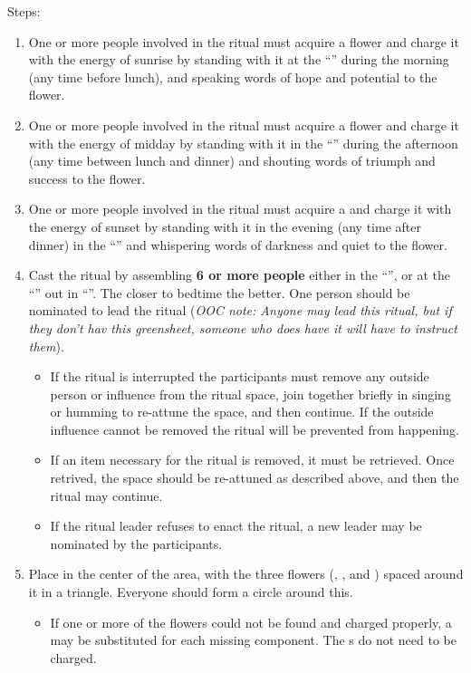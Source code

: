 \documentclass[green]{GL2020}
\begin{document}
Steps:
\begin{enumerate}
  \item One or more people involved in the ritual must acquire a \iMorningGlory{} flower and charge it with the energy of sunrise by standing with it at the ``\pGarden{}'' during the morning (any time before lunch), and speaking words of hope and potential to the flower. 
  \item One or more people involved in the ritual must acquire a \iLily{} flower and charge it with the energy of midday by standing with it in the ``\pTrainingField{}'' during the afternoon (any time between lunch and dinner) and shouting words of triumph and success to the flower.
  \item One or more people involved in the ritual must acquire a \iBlackCrocus{} and charge it with the energy of sunset by standing with it in the evening (any time after dinner)  in the ``\pGraveyard{}'' and whispering words of darkness and quiet to the flower.
  \item Cast the ritual by assembling \textbf{6 or more people} either in the ``\pStudentLoungeBunker{}'', or at the ``\sMemorialToFallenStudents{}'' out in ``\pGraveyard{}''. The closer to bedtime the better. One person should be nominated to lead the ritual (\emph{OOC note: Anyone may lead this ritual, but if they don't hav this greensheet, someone who does have it will have to instruct them}). 
  \begin{itemize}
  \item  If the ritual is interrupted the participants must remove any outside person or influence from the ritual space, join together briefly in singing or humming to re-attune the space, and then continue. If the outside influence cannot be removed the ritual will be prevented from happening.
  \item If an item necessary for the ritual is removed, it must be retrieved. Once retrived, the space should be re-attuned as described above, and then the ritual may continue.
  \item If the ritual leader refuses to enact the ritual, a new leader may be nominated by the participants.
  \end{itemize}
  \item Place \iMirror{} in the center of the area, with the three flowers (\iMorningGlory{}, \iLily{}, and \iBlackCrocus{}) spaced around it in a triangle. Everyone should form a circle around this.
  \begin{itemize}
  \item If one or more of the flowers could not be found and charged properly, a \iStoneFlower{} may be substituted for each missing component. The \iStoneFlower{}s do not need to be charged.

\end{itemize}
\end{enumerate}
\end{document}
